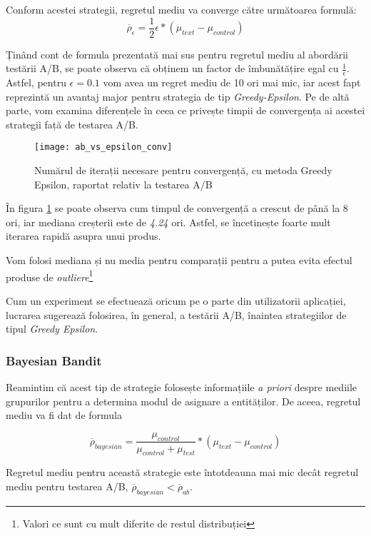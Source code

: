 Conform acestei strategii, regretul mediu va converge către următoarea formulă: \[
	\overline{\rho}_{\epsilon} = \frac{1}{2} \epsilon * (\mu_{text} - \mu_{control}) 
\]

Ținând cont de formula prezentată mai sus pentru regretul mediu al abordării testării A/B, se poate observa că obținem un factor de îmbunătățire egal cu $\frac{1}{\epsilon}$. Astfel, pentru $\epsilon = 0.1$ vom avea un regret mediu de 10 ori mai mic, iar acest fapt reprezintă un avantaj major pentru strategia de tip \textit{Greedy-Epsilon}. Pe de altă parte, vom examina diferențele în ceea ce privește timpii de convergența ai acestei strategii față de testarea A/B.

\begin{figure}[H]
	\centering
	\texttt{[image: ab\_vs\_epsilon\_conv]}
	\caption{Numărul de iterații necesare pentru convergență, cu metoda Greedy Epsilon, raportat relativ la testarea  A/B}
	\label{fig:ab_vs_epsilon_conv}
\end{figure}

În figura \ref{fig:ab_vs_epsilon_conv} se poate observa cum timpul de convergență a crescut de până la 8 ori, iar mediana creșterii este de \textit{4.24} ori. Astfel, se încetinește foarte mult iterarea rapidă asupra unui produs. 

\begin{remark}
	Vom folosi mediana și nu media pentru comparații pentru a putea evita efectul produse de \textit{outliere}\footnote{Valori ce sunt cu mult diferite de restul distribuției}
\end{remark}

Cum un experiment se efectuează oricum pe o parte din utilizatorii aplicației, lucrarea sugerează folosirea, în general, a testării A/B, înaintea strategiilor de tipul \textit{Greedy Epsilon}.

\subsubsection{Bayesian Bandit}

Reamintim că acest tip de strategie folosește informațiile \textit{a priori} despre mediile grupurilor pentru a determina modul de asignare a entităților. De aceea, regretul mediu va fi dat de formula 

\[
\overline{\rho}_{bayesian} = \frac{\mu_{control}}{\mu_{control} + \mu_{test}} * (\mu_{text} - \mu_{control})
\]

\begin{theorem}
	Regretul mediu pentru această strategie este întotdeauna mai mic decât regretul mediu pentru testarea A/B, $\overline{\rho}_{bayesian} < \overline{\rho}_{ab}$.
\end{theorem}


